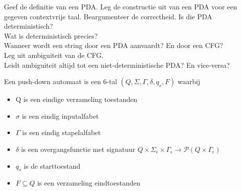 \begin{question}
  Geef de definitie van een PDA. Leg de constructie uit van een PDA voor een gegeven contextvrije taal. Beargumenteer de correctheid.
  Is die PDA deterministisch?\\
  Wat is deterministisch precies?\\
  Wanneer wordt een string door een PDA aanvaardt? En door een CFG?\\
  Leg uit ambiguiteit van de CFG.\\
  Leidt ambiguiteit altijd tot een niet-deterministische PDA? En vice-versa?
\end{question}

\begin{theorem}
  Een push-down automaat is een 6-tal $(Q,\Sigma, \Gamma, \delta, q_s, F)$ waarbij
  \begin{itemize}
    \item Q is een eindige verzameling toestanden
    \item $\sigma$ is een eindig inputalfabet
    \item $\Gamma$ is een eindig stapelalfabet
    \item $\delta$ is een overgangsfunctie met signatuur $Q \times \Sigma_\epsilon \times \Gamma_\epsilon \rightarrow \mathcal{P}(Q \times \Gamma_\epsilon)$
    \item $q_s$ is de starttoestand
    \item $F \subseteq Q$ is een verzameling eindtoestanden
  \end{itemize}
\end{theorem}

